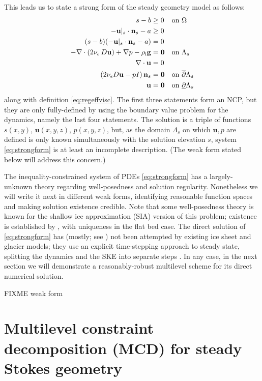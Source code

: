 \documentclass[letterpaper,final,12pt,reqno]{amsart}
\theoremstyle{claim}
\newcommand{\eps}{\epsilon}
\newcommand{\bn}{\mathbf{n}}
\newcommand{\bu}{\mathbf{u}}
\newcommand{\bzero}{\bm{0}}
\newcommand{\rhoi}{\rho_{\text{i}}}
\numberwithin{equation}{section}
\numberwithin{figure}{section}
\numberwithin{table}{section}
\numberwithin{theorem}{section}
\begin{document}
This leads us to state a strong form of the steady geometry model as follows:
\begin{align}
s - b &\ge 0 && \text{on $\Omega$} \label{eq:strongform} \\
- \bu|_s \cdot \bn_s - a &\ge 0 \notag \\
(s - b) (- \bu|_s \cdot \bn_s - a) &= 0 \notag \\
- \nabla \cdot \left(2 \nu_\eps\, D\bu\right) + \nabla p - \rhoi \mathbf{g} &= \bzero && \text{on $\Lambda_s$} \notag \\
\nabla \cdot \bu &= 0 \notag \\
\left(2 \nu_\eps D\bu - pI\right) \bn_s &= \bzero && \text{on $\overline{\partial} \Lambda_s$} \notag \\
\bu &= \bzero && \text{on $\underline{\partial} \Lambda_s$} \notag
\end{align}
along with definition \eqref{eq:regeffvisc}.  The first three statements form an NCP, but they are only fully-defined by using the boundary value problem for the dynamics, namely the last four statements.  The solution is a triple of functions $s(x,y)$, $\bu(x,y,z)$, $p(x,y,z)$, but, as the domain $\Lambda_s$ on which $\bu,p$ are defined is only known simultaneously with the solution elevation $s$, system \eqref{eq:strongform} is at least an incomplete description.  (The weak form stated below will address this concern.)

The inequality-constrained system of PDEs \eqref{eq:strongform} has a largely-unknown theory regarding well-posedness and solution regularity.  Nonetheless we will write it next in different weak forms, identifying reasonable function spaces and making solution existence credible.  Note that some well-posedness theory is known for the shallow ice approximation (SIA) version of this problem; existence is established by \cite{JouvetBueler2012}, with uniqueness in the flat bed case.  The direct solution of \eqref{eq:strongform} has (mostly; see \cite{WirbelJarosch2020}) not been attempted by existing ice sheet and glacier models; they use an explicit time-stepping approach to steady state, splitting the dynamics and the SKE into separate steps \cite[for example]{Jouvetetal2008,Lengetal2012}.  In any case, in the next section we will demonstrate a reasonably-robust multilevel scheme for its direct numerical solution.

FIXME weak form

\section{Multilevel constraint decomposition (MCD) for steady Stokes geometry} \label{sec:mcdstokes}
\end{document}
